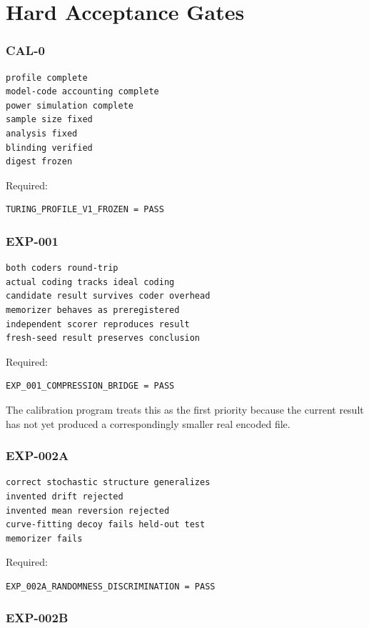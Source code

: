 \documentclass[11pt]{article}
\begin{document}
\part{Hard Acceptance Gates}

\section{CAL-0}

\begin{verbatim}
profile complete
model-code accounting complete
power simulation complete
sample size fixed
analysis fixed
blinding verified
digest frozen
\end{verbatim}
Required:
\begin{verbatim}
TURING_PROFILE_V1_FROZEN = PASS
\end{verbatim}

\section{EXP-001}

\begin{verbatim}
both coders round-trip
actual coding tracks ideal coding
candidate result survives coder overhead
memorizer behaves as preregistered
independent scorer reproduces result
fresh-seed result preserves conclusion
\end{verbatim}
Required:
\begin{verbatim}
EXP_001_COMPRESSION_BRIDGE = PASS
\end{verbatim}
The calibration program treats this as the first priority because the current result has not yet produced a correspondingly smaller real encoded file.

\section{EXP-002A}

\begin{verbatim}
correct stochastic structure generalizes
invented drift rejected
invented mean reversion rejected
curve-fitting decoy fails held-out test
memorizer fails
\end{verbatim}
Required:
\begin{verbatim}
EXP_002A_RANDOMNESS_DISCRIMINATION = PASS
\end{verbatim}

\section{EXP-002B}
\end{document}
